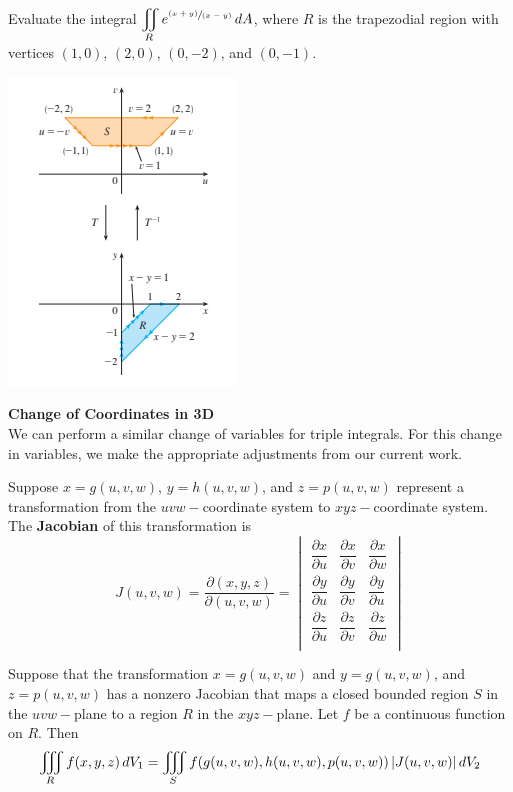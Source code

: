 \documentclass[../mathNotesPreamble]{subfiles}
\begin{document}
  \begin{ex*}
    Evaluate the integral $\displaystyle\iint\limits_R e^{\sfrac{{\left(x+y\right)}}{{\left(x-y\right)}}}\,dA$, where $R$ is the trapezodial region with vertices $(1,0)$, $(2,0)$, $(0,-2)$, and $(0,-1).$
  \end{ex*}
  \begin{flushleft}
    \includegraphics[width=.35\linewidth]{../images/briggs_16_07/fig16_21}
  \end{flushleft}
  \pagebreak

  \noindent
  \textbf{Change of Coordinates in 3D}\\
  
  \noindent 
  We can perform a similar change of variables for triple integrals. For this change in variables, we make the appropriate adjustments from our current work.
  \begin{defn*}[Jacobian in 3D]
    Suppose $x=g(u,v,w)$, $y=h(u,v,w)$, and $z=p(u,v,w)$ represent a transformation from the $uvw-$coordinate system to $xyz-$coordinate system. The \textbf{Jacobian} of this transformation is
    \[
      J(u,v,w)=\dfrac{\partial(x,y,z)}{\partial(u,v,w)}=
      \begin{vmatrix}
        \dfrac{\partial x}{\partial u}& \dfrac{\partial x}{\partial v}& \dfrac{\partial x}{\partial w}\\[2ex]
        \dfrac{\partial y}{\partial u}& \dfrac{\partial y}{\partial v}& \dfrac{\partial y}{\partial u}\\[2ex]
        \dfrac{\partial z}{\partial u}& \dfrac{\partial z}{\partial v}& \dfrac{\partial z}{\partial w}\\
      \end{vmatrix}
    \]
  \end{defn*}

  \begin{thmBox*}
    Suppose that the transformation $x=g(u,v,w)$ and $y=g(u,v,w)$, and $z=p(u,v,w)$ has a nonzero Jacobian that maps a closed bounded region $S$ in the $uvw-$plane to a region $R$ in the $xyz-$plane. Let $f$ be a continuous function on $R$. Then
    \[
      \iiint\limits_R f(x,y,z)\,dV_1=\iiint\limits_S f{\left(g(u,v,w),h(u,v,w),p(u,v,w)\right)} \,{\left\vert J(u,v,w)\right\vert}\,dV_2
    \]
  \end{thmBox*}
\end{document}
